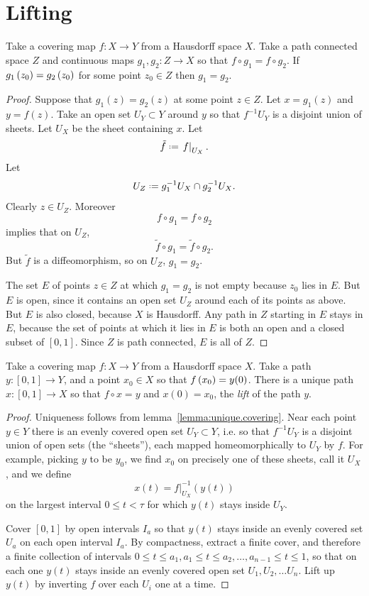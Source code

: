 \section{Lifting}
\begin{lemma}\label{lemma:unique.covering}
Take a covering map \(f \colon X \to Y\) from a Hausdorff space \(X\).
Take a path connected space \(Z\) and continuous maps \(g_1, g_2 \colon Z \to X\) so that \(f \circ g_1 = f \circ g_2\).
If \(g_1\left(z_0\right)=g_2\left(z_0\right)\) for some point \(z_0 \in Z\) then \(g_1=g_2\).
\end{lemma}
\begin{proof}
Suppose that \(g_1(z)=g_2(z)\) at some point \(z \in Z\).
Let \(x=g_1(z)\) and \(y=f(z)\).
Take an open set \(U_Y \subset Y\) around \(y\) so that \(f^{-1}U_Y\) is a disjoint union of sheets.
Let \(U_X\) be the sheet containing \(x\).
Let
\[
\tilde{f} \defeq \left.f\right|_{U_X}.
\]
Let 
\[
U_Z\defeq g_1^{-1} U_X \cap g_2^{-1} U_X.
\]
Clearly \(z \in U_Z\).
Moreover 
\[
f \circ g_1 = f \circ g_2
\]
implies that on \(U_Z\),
\[
\tilde{f} \circ g_1 = \tilde{f} \circ g_2.
\]
But \(\tilde{f}\) is a diffeomorphism, so on \(U_Z\), \(g_1=g_2\).

The set \(E\) of points \(z \in Z\) at which \(g_1=g_2\) is not empty because \(z_0\) lies in \(E\).
But \(E\) is open, since it contains an open set \(U_Z\) around each of its points as above.
But \(E\) is also closed, because \(X\) is Hausdorff.
Any path in \(Z\) starting in \(E\) stays in \(E\), because the set of points at which it lies in \(E\) is both an open and a closed subset of \([0,1]\).
Since \(Z\) is path connected, \(E\) is all of \(Z\).
\end{proof}
\begin{proposition}\label{covering.spaces:lift.path}
Take a covering map \(f \colon X \to Y\) from a Hausdorff space \(X\).
Take a path \(y \colon [0,1] \to Y\), and a point \(x_0 \in X\) so that \(f\left(x_0\right)=y(0)\).
There is a unique path \(x \colon [0,1] \to X\) so that \(f \circ x=y\) and \(x(0)=x_0\), the \emph{lift} of the path \(y\).
\end{proposition}
\begin{proof}
Uniqueness follows from lemma~\vref{lemma:unique.covering}.
Near each point \(y \in Y\) there is an evenly covered open set \(U_Y \subset Y\), i.e. so that \(f^{-1}U_Y\) is a disjoint union of open sets (the ``sheets''), each mapped homeomorphically to \(U_Y\) by \(f\).
For example, picking \(y\) to be \(y_0\), we find \(x_0\) on precisely one of these sheets, call it \(U_X\), and we define 
\[
x(t)=\left.f\right|_{U_X}^{-1}(y(t))
\] 
on the largest interval \(0 \le t < \tau\) for which \(y(t)\) stays inside \(U_Y\).

Cover \([0,1]\) by open intervals \(I_a\) so that \(y(t)\) stays inside an evenly covered set \(U_a\) on each open interval \(I_a\).
By compactness, extract a finite cover, and therefore a finite collection of intervals \(0 \le t \le a_1, a_1 \le t \le a_2, \dots, a_{n-1} \le t \le 1\), so that on each one \(y(t)\) stays inside an evenly covered open set \(U_1, U_2, \dots U_n\).
Lift up \(y(t)\) by inverting \(f\) over each \(U_i\) one at a time.
\end{proof}
